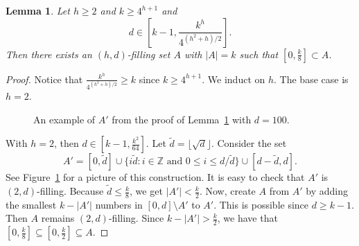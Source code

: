 \documentclass{daj}
\newtheorem{lemma}[theorem]{Lemma}
\theoremstyle{definition}
\theoremstyle{remark}
\numberwithin{equation}{section}
\numberwithin{theorem}{section}
\newcommand{\Z}{\mathbb{Z}}
\begin{document}
\begin{lemma}\label{lemmaauxilliary}
    Let $h \geq 2$ and $k \geq 4^{h+1}$ and \[d \in \left[k-1,\frac{k^h}{4^{(h^2+h)/2}}\right].\] Then there exists an $(h,d)$-filling set $A$ with $|A| = k$ such that $[0,\frac{k}{8}] \subset A$.
\end{lemma}
\begin{proof}
    Notice that $\frac{k^h}{4^{(h^2+h)/2}} \geq k$ since $k \geq 4^{h+1}$. We induct on $h$. The base case is $h = 2$.

    \begin{figure}
            \centering
            \caption{An example of $A'$ from the proof of Lemma~\ref{lemmaauxilliary} with $d = 100$.}
            \label{figA'}
            
            \end{figure}

    With $h=2$, then $d \in [k-1,\frac{k^2}{64}]$. Let $\tilde{d} = \lfloor \sqrt{d}\rfloor$. Consider the set \[A' = [0, \tilde{d}] \cup \{i\tilde{d}: i \in \Z\text{ and } 0 \leq i \leq d/\tilde{d}\} \cup [d-\tilde{d},d].\] See Figure~\ref{figA'} for a picture of this construction. It is easy to check that $A'$ is $(2,d)$-filling. Because $\tilde{d} \leq \frac{k}8$, we get $|A'| < \frac{k}{2}$. Now, create $A$ from $A'$ by adding the smallest $k - |A'|$ numbers in $[0,d]\setminus A'$ to $A'$. This is possible since $d \geq k-1$. Then $A$ remains $(2,d)$-filling. Since $k - |A'|>\frac{k}{2}$, we have that $[0,\frac{k}{8}]\subseteq [0,\frac{k}{2}] \subseteq A$.
        

\end{proof}
\end{document}
